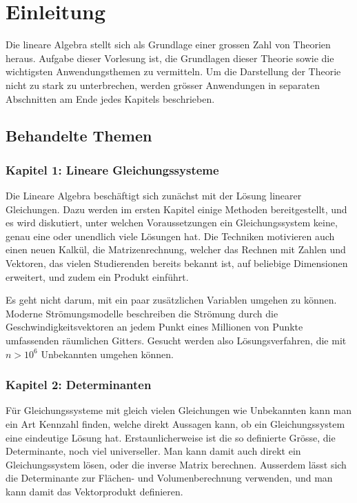 %
%
%
\chapter*{Einleitung}
Die lineare Algebra stellt sich als Grundlage einer grossen
Zahl von Theorien heraus.
Aufgabe dieser Vorlesung ist, die
Grundlagen dieser Theorie sowie die wichtigsten Anwendungsthemen
zu vermitteln.
Um die Darstellung der Theorie nicht zu stark zu unterbrechen,
werden grösser Anwendungen in separaten Abschnitten am Ende
jedes Kapitels beschrieben.

\section*{Behandelte Themen}
\subsection*{Kapitel 1: Lineare Gleichungssysteme}
Die Lineare Algebra beschäftigt sich zunächst mit der Lösung linearer
Gleichungen.
Dazu werden im ersten Kapitel einige Methoden bereitgestellt,
und es wird diskutiert, unter welchen Voraussetzungen ein
Gleichungssystem keine, genau eine oder unendlich viele
Lösungen hat.
Die Techniken motivieren auch einen neuen Kalkül, die Matrizenrechnung,
welcher das Rechnen mit Zahlen und Vektoren, das vielen
Studierenden bereits bekannt ist, auf beliebige Dimensionen erweitert,
und zudem ein Produkt einführt.

Es geht nicht darum, mit ein paar zusätzlichen Variablen umgehen
zu können.
Moderne Strömungsmodelle beschreiben die Strömung durch die
Geschwindigkeitsvektoren an jedem Punkt eines Millionen von Punkte
umfassenden räumlichen Gitters.
Gesucht werden also Lösungsverfahren, die mit $n>10^6$ Unbekannten
umgehen können.

\subsection*{Kapitel 2: Determinanten}
Für Gleichungssysteme mit gleich vielen Gleichungen wie Unbekannten
kann man ein Art Kennzahl finden, welche direkt Aussagen kann,
ob ein Gleichungssystem eine eindeutige Lösung hat.
Erstaunlicherweise ist die so definierte Grösse, die Determinante,
noch viel universeller.
Man kann damit auch direkt ein Gleichungssystem lösen, oder
die inverse Matrix berechnen.
Ausserdem lässt sich die Determinante zur Flächen- und Volumenberechnung
verwenden, und man kann damit das Vektorprodukt definieren.

